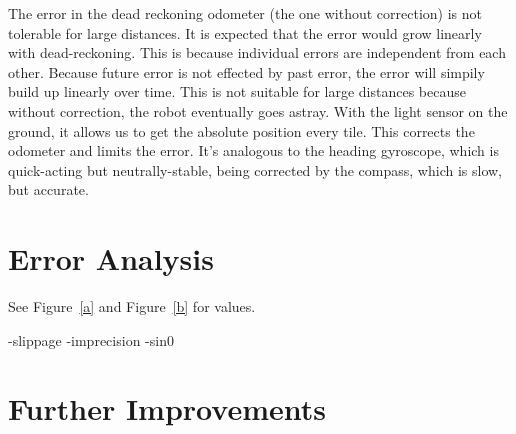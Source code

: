 \documentclass[twocolumn]{article}
\begin{document}
The error in the dead reckoning odometer (the one without correction) is not tolerable for large distances. It is expected that the error would grow linearly with dead-reckoning. This is because individual errors are independent from each other. Because future error is not effected by past error, the error will simpily build up linearly over time. This is not suitable for large distances because without correction, the robot eventually goes astray. With the light sensor on the ground, it allows us to get the absolute position every tile. This corrects the odometer and limits the error. It's analogous to the heading gyroscope, which is quick-acting but neutrally-stable, being corrected by the compass, which is slow, but accurate.

\section{Error Analysis}

See Figure~\ref{a} and Figure~\ref{b} for values.

-slippage
-imprecision
-sin0

\section{Further Improvements}
\end{document}

